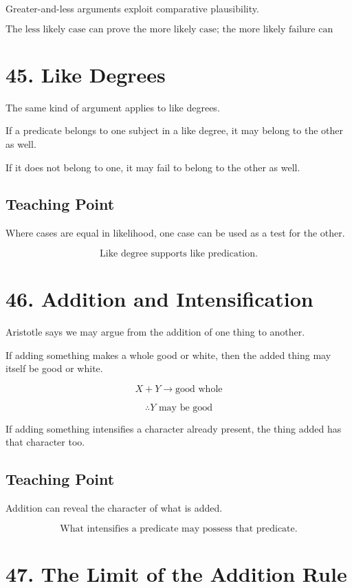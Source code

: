 \documentclass[12pt]{article}
\begin{document}
Greater-and-less arguments exploit comparative plausibility.

\[
\boxed{
\text{The less likely case can prove the more likely case; the more likely failure can refute the less likely.}
}
\]

\section*{45. Like Degrees}

The same kind of argument applies to like degrees.

If a predicate belongs to one subject in a like degree, it may belong to the
other as well.

If it does not belong to one, it may fail to belong to the other as well.

\subsection*{Teaching Point}

Where cases are equal in likelihood, one case can be used as a test for the
other.

\[
\boxed{
\text{Like degree supports like predication.}
}
\]

\section*{46. Addition and Intensification}

Aristotle says we may argue from the addition of one thing to another.

If adding something makes a whole good or white, then the added thing may
itself be good or white.

\[
X + Y \rightarrow \text{good whole}
\]

\[
\therefore Y \text{ may be good}
\]

If adding something intensifies a character already present, the thing added
has that character too.

\subsection*{Teaching Point}

Addition can reveal the character of what is added.

\[
\boxed{
\text{What intensifies a predicate may possess that predicate.}
}
\]

\section*{47. The Limit of the Addition Rule}
\end{document}
